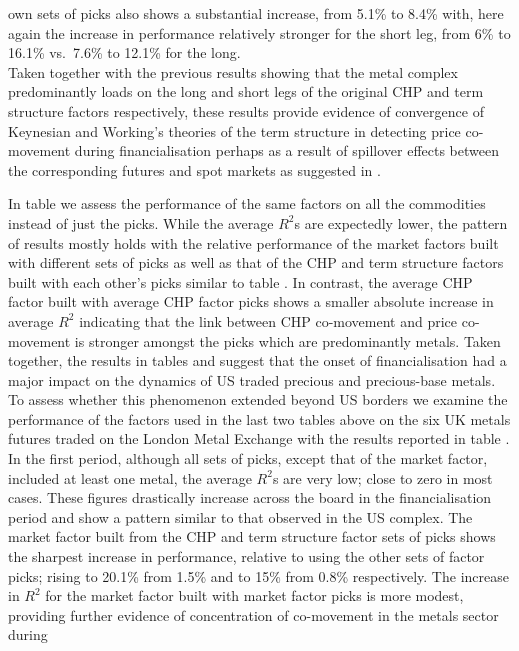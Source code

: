 \documentclass[
  authoryear,
  preprint,
  3p]{elsarticle}
\begin{document}
own sets of picks also shows a substantial increase, from 5.1\% to 8.4\%
with, here again the increase in performance relatively stronger for the
short leg, from 6\% to 16.1\% vs.~7.6\% to 12.1\% for the long.\\
Taken together with the previous results showing that the metal complex
predominantly loads on the long and short legs of the original CHP and
term structure factors respectively, these results provide evidence of
convergence of Keynesian and Working's theories of the term structure in
detecting price co-movement during financialisation perhaps as a result
of spillover effects between the corresponding futures and spot markets
as suggested in \citet{basak_model_2016}.

\medskip

In table we assess the performance of the same factors on all the
commodities instead of just the picks. While the average \(R^{2}\)s are
expectedly lower, the pattern of results mostly holds with the relative
performance of the market factors built with different sets of picks as
well as that of the CHP and term structure factors built with each
other's picks similar to table . In contrast, the average CHP factor
built with average CHP factor picks shows a smaller absolute increase in
average \(R^{2}\) indicating that the link between CHP co-movement and
price co-movement is stronger amongst the picks which are predominantly
metals. Taken together, the results in tables and suggest that the onset
of financialisation had a major impact on the dynamics of US traded
precious and precious-base metals.\\
To assess whether this phenomenon extended beyond US borders we examine
the performance of the factors used in the last two tables above on the
six UK metals futures traded on the London Metal Exchange with the
results reported in table . In the first period, although all sets of
picks, except that of the market factor, included at least one metal,
the average \(R^{2}\)s are very low; close to zero in most cases. These
figures drastically increase across the board in the financialisation
period and show a pattern similar to that observed in the US complex.
The market factor built from the CHP and term structure factor sets of
picks shows the sharpest increase in performance, relative to using the
other sets of factor picks; rising to 20.1\% from 1.5\% and to 15\% from
0.8\% respectively. The increase in \(R^{2}\) for the market factor
built with market factor picks is more modest, providing further
evidence of concentration of co-movement in the metals sector during
\end{document}
